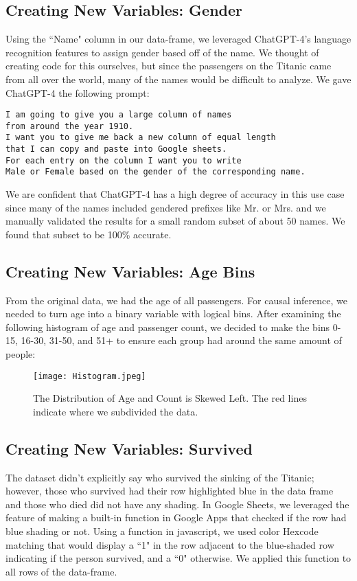 \documentclass[12pt]{article}
\begin{document}
\subsection{Creating New Variables: Gender}
\doublespacing
Using the ``Name" column in our data-frame, we leveraged ChatGPT-4's language recognition features to assign gender based off of the name. We thought of creating code for this ourselves, but since the passengers on the Titanic came from all over the world, many of the names would be difficult to analyze. We gave ChatGPT-4 the following prompt:
\begin{verbatim}
I am going to give you a large column of names 
from around the year 1910. 
I want you to give me back a new column of equal length 
that I can copy and paste into Google sheets. 
For each entry on the column I want you to write 
Male or Female based on the gender of the corresponding name.
\end{verbatim}
We are confident that ChatGPT-4 has a high degree of accuracy in this use case since many of the names included gendered prefixes like Mr. or Mrs. and we manually validated the results for a small random subset of about 50 names. We found that subset to be 100\% accurate.

\subsection{Creating New Variables: Age Bins}
\doublespacing
From the original data, we had the age of all passengers. For causal inference, we needed to turn age into a binary variable with logical bins. After examining the following histogram of age and passenger count, we decided to make the bins 0-15, 16-30, 31-50, and 51+ to ensure each group had around the same amount of people:

\begin{figure}[H]
    \centering
    \texttt{[image: Histogram.jpeg]}
    \caption{The Distribution of Age and Count is Skewed Left. The red lines indicate where we subdivided the data.}
    \label{fig:age_hist}
\end{figure}

\subsection{Creating New Variables: Survived}
\doublespacing
The dataset didn't explicitly say who survived the sinking of the Titanic; however, those who survived had their row highlighted blue in the data frame and those who died did not have any shading. In Google Sheets, we leveraged the feature of making a built-in function in Google Apps that checked if the row had blue shading or not. Using a function in javascript, we used color Hexcode matching that would display a ``1" in the row adjacent to the blue-shaded row indicating if the person survived, and a ``0" otherwise. We applied this function to all rows of the data-frame.
\end{document}

